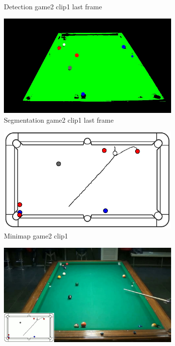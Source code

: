 \begin{figure}[H]
\begin{subfigure}[b]{0.48\textwidth}
        \caption{Detection game2 clip1 last frame}
        \label{fig: game2_clip1_last_frame_detected}
    \end{subfigure}
    \begin{subfigure}[b]{0.48\textwidth}
        \centering
        \includegraphics[width=\textwidth]{images/Segmentation/game2_clip1_segmented_balls_last_frame.jpg}
        \caption{Segmentation game2 clip1 last frame}
		\label{fig: game2_clip1_last_frame_segmented}
    \end{subfigure}
    \begin{subfigure}[b]{0.48\textwidth}
    	\centering
    	\includegraphics[width=\textwidth]{images/AllMinimap/game2_clip1_minimap.png}
    	\caption{Minimap game2 clip1}
    	\label{fig: game2_clip1_minimap}
    \end{subfigure}
    \begin{subfigure}[b]{0.48\textwidth}
    	\centering
    	\includegraphics[width=\textwidth]{images/Video/game2_clip1_video.jpg}

\end{subfigure}
\end{figure}
